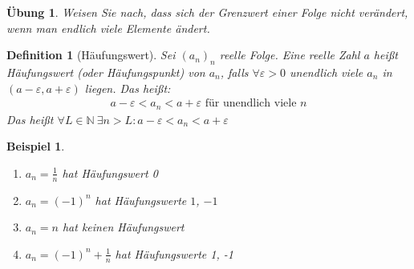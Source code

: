\documentclass[11pt, twoside, a4paper]{article}
\theoremstyle{plain}
\newtheorem{definition}[blockelement]{Definition}
\newtheorem{uebung}[blockelement]{Übung}
\newtheorem{beispiel}[blockelement]{Beispiel}
\newcommand{\pair}[1]{\left(#1\right)}
\newcommand{\theoremescape}{\leavevmode}
\newcommand{\naturalnumbers}{\mathbb{N}}
\begin{document}
    \begin{uebung}
        Weisen Sie nach, dass sich der Grenzwert einer Folge nicht verändert, wenn man endlich viele Elemente ändert.
    \end{uebung}

    \begin{definition}[Häufungswert]
        Sei $(a_n)_n$ reelle Folge. Eine reelle Zahl $a$ heißt Häufungswert (oder Häufungspunkt) von $a_n$, falls $\forall \varepsilon >0$ unendlich viele $a_n$ in $\pair{a-\varepsilon, a+\varepsilon}$ liegen. Das heißt:
        \begin{align*}
            a-\varepsilon < a_n < a+ \varepsilon\text{ für unendlich viele $n$}
        \end{align*}
        Das heißt $\forall L\in\naturalnumbers~\exists n> L\colon a-\varepsilon < a_n < a+\varepsilon$
    \end{definition}

    \begin{beispiel}
        \theoremescape
        \begin{enumerate}
            \item $a_n=\frac{1}{n}$ hat Häufungswert 0
            \item $a_n=(-1)^n$ hat Häufungswerte $1$, $-1$
            \item $a_n=n$ hat keinen Häufungswert
            \item $a_n=(-1)^n+\frac{1}{n}$ hat Häufungswerte 1, -1
        \end{enumerate}
    \end{beispiel}
\end{document}
